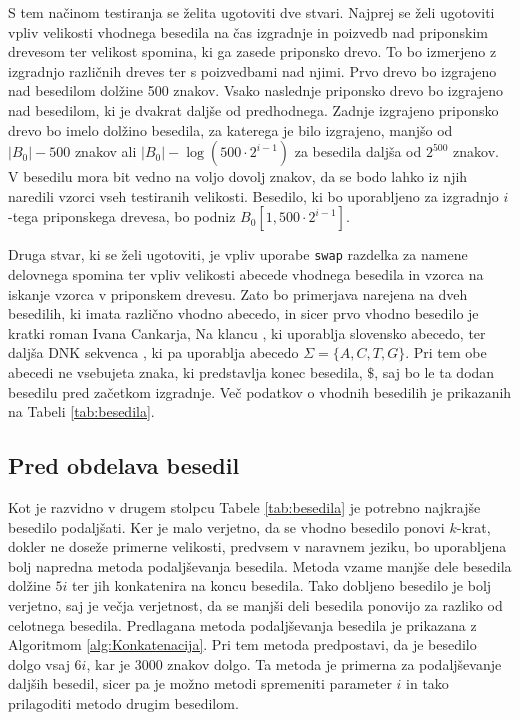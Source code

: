 S tem načinom testiranja se želita ugotoviti dve stvari. Najprej se želi ugotoviti vpliv velikosti vhodnega besedila na čas izgradnje in poizvedb nad priponskim drevesom ter velikost spomina, ki ga zasede priponsko drevo. To bo izmerjeno z izgradnjo različnih dreves ter s poizvedbami nad njimi. Prvo drevo bo izgrajeno nad besedilom dolžine 500 znakov. Vsako naslednje priponsko drevo bo izgrajeno nad besedilom, ki je dvakrat daljše od predhodnega. Zadnje izgrajeno priponsko drevo bo imelo dolžino besedila, za katerega je bilo izgrajeno, manjšo od $|B_0|-500$ znakov ali $|B_0|-\log{(500\cdot2^{i-1})}$ za besedila daljša od $2^{500}$ znakov. V besedilu mora bit vedno na voljo dovolj znakov, da se bodo lahko iz njih naredili vzorci vseh testiranih velikosti. Besedilo, ki bo uporabljeno za izgradnjo $i$-tega priponskega drevesa, bo podniz $B_0[1,500\cdot2^{i-1}]$.

 Druga stvar, ki se želi ugotoviti, je vpliv uporabe \verb|swap| razdelka za namene delovnega spomina ter vpliv velikosti abecede vhodnega besedila in vzorca na iskanje vzorca v priponskem drevesu. Zato bo primerjava narejena na dveh besedilih, ki imata različno vhodno abecedo, in sicer prvo vhodno besedilo je kratki roman Ivana Cankarja, Na klancu \cite{podatkiNaKlancu}, ki uporablja slovensko abecedo, ter daljša DNK sekvenca \cite{podatki}, ki pa uporablja abecedo $\Sigma = \{A,C,T,G\}$. Pri tem obe abecedi ne vsebujeta znaka, ki predstavlja konec besedila, $\$$, saj bo le ta dodan besedilu pred začetkom izgradnje. Več podatkov o vhodnih besedilih je prikazanih na Tabeli \ref{tab:besedila}.


\subsection{Pred obdelava besedil}

Kot je razvidno v drugem stolpcu Tabele \ref{tab:besedila} je potrebno najkrajše besedilo podaljšati. Ker je malo verjetno, da se vhodno besedilo ponovi $k$-krat, dokler ne doseže primerne velikosti, predvsem v naravnem jeziku, bo uporabljena bolj napredna metoda podaljševanja besedila. Metoda vzame manjše dele besedila dolžine $5i$ ter jih konkatenira na koncu besedila. Tako dobljeno besedilo je bolj verjetno, saj je večja verjetnost, da se manjši deli besedila ponovijo za razliko od celotnega besedila. Predlagana metoda podaljševanja besedila je prikazana z Algoritmom \ref{alg:Konkatenacija}. Pri tem metoda predpostavi, da je besedilo dolgo vsaj $6i$, kar je $3000$ znakov dolgo. Ta metoda je primerna za podaljševanje daljših besedil, sicer pa je možno metodi spremeniti parameter $i$ in tako prilagoditi metodo drugim besedilom.

